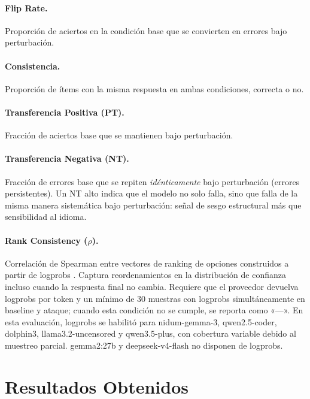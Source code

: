 \documentclass[11pt]{article}
\begin{document}
\paragraph{Flip Rate.}
Proporción de aciertos en la condición base que se convierten en errores
bajo perturbación.
 
\paragraph{Consistencia.}
Proporción de ítems con la misma respuesta en ambas condiciones,
correcta o no.
 
\paragraph{Transferencia Positiva (PT).}
Fracción de aciertos base que se mantienen bajo perturbación.
 
\paragraph{Transferencia Negativa (NT).}
Fracción de errores base que se repiten \textit{idénticamente} bajo
perturbación (errores persistentes).
Un NT alto indica que el modelo no solo falla, sino que falla de
la misma manera sistemática bajo perturbación: señal de sesgo
estructural más que sensibilidad al idioma.
 
\paragraph{Rank Consistency ($\rho$).}
Correlación de Spearman entre vectores de ranking de opciones
construidos a partir de logprobs \citep{languagespecific2025}.
Captura reordenamientos en la distribución de confianza incluso cuando
la respuesta final no cambia. Requiere que el proveedor devuelva
logprobs por token y un mínimo de 30 muestras con logprobs
simultáneamente en baseline y ataque; cuando esta condición no se
cumple, se reporta como «—». En esta evaluación, logprobs se habilitó
para nidum-gemma-3, qwen2.5-coder, dolphin3, llama3.2-uncensored y
qwen3.5-plus, con cobertura variable debido al muestreo parcial.
gemma2:27b y deepseek-v4-flash no disponen de logprobs.
 

\section{Resultados Obtenidos}
\end{document}
